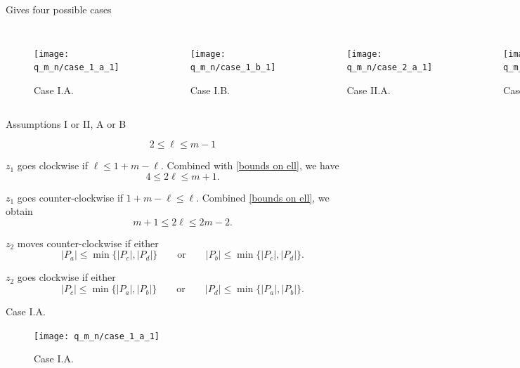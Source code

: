 \begin{frame}{Gives four possible cases}
\begin{columns}[onlytextwidth, T]
\begin{figure}
  \texttt{[image: q\_m\_n/case\_1\_a\_1]}
  \caption{Case I.A.}
\end{figure}
\begin{figure}
  \texttt{[image: q\_m\_n/case\_1\_b\_1]}
  \caption{Case I.B.}
\end{figure}
\begin{figure}
  \texttt{[image: q\_m\_n/case\_2\_a\_1]}
  \caption{Case II.A.}
\end{figure}
\begin{figure}
  \texttt{[image: q\_m\_n/case\_2\_b\_1]}
  \caption{Case II.B.}
\end{figure}
\end{columns}
\end{frame}


\begin{frame}{Assumptions I or II, A or B}

\[ 2 \leq \ell \leq m-1 \tag{1} \label{bounds on ell} \]

$z_1$ goes clockwise if $\ell \leq 1 + m - \ell$. Combined with \ref{bounds on ell}, we have
\[ 4 \leq 2 \ell \leq m + 1 \tag{A} \label{assumption a} . \]

$z_1$ goes counter-clockwise if $1 + m - \ell \leq \ell$. Combined \ref{bounds on ell}, we obtain
\[ m + 1 \leq 2 \ell \leq 2m - 2 \tag{B} \label{assumption b} . \]

$z_2$ moves counter-clockwise if either
\[ |P_a| \leq \min \{ |P_c|, |P_d| \}\qquad \text{or} \qquad |P_b| \leq \min \{ |P_c|, |P_d| \} \tag{I} \label{assumption i} . \]

$z_2$ goes clockwise if either
\[ |P_c| \leq \min \{ |P_a|, |P_b| \}\qquad \text{or} \qquad |P_d| \leq \min \{ |P_a|, |P_b| \} \tag{II} \label{assumption ii}. \]
\end{frame}

\begin{frame}{Case I.A.}
\begin{figure}
\texttt{[image: q\_m\_n/case\_1\_a\_1]}
\caption{Case I.A.}
\end{figure}
\end{frame}

